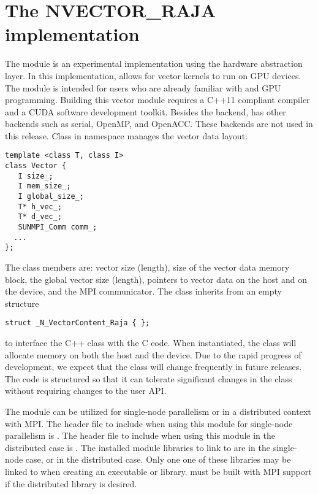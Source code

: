 %
\section{The NVECTOR\_RAJA implementation}\label{ss:nvec_raja}

The {\nvecraja} module is an experimental {\nvector} implementation using the
\href{https://software.llnl.gov/RAJA/}{\raja} hardware abstraction layer.
In this implementation, {\raja}
allows for {\sundials} vector kernels to run on GPU devices. The module is intended for users
who are already familiar with {\raja} and GPU programming. Building this vector
module requires a C++11 compliant compiler and a CUDA software development toolkit.
Besides the {\cuda} backend, {\raja} has other backends such as serial, OpenMP,
and OpenACC. These backends are not used in this {\sundials} release.
Class  in namespace  manages the vector data layout:
\begin{verbatim}
template <class T, class I>
class Vector {
   I size_;
   I mem_size_;
   I global_size_;
   T* h_vec_;
   T* d_vec_;
   SUNMPI_Comm comm_;
  ...
};
\end{verbatim}
The class members are: vector size (length), size of the vector data
memory block, the global vector size (length), pointers to vector data
on the host and on the device, and the MPI communicator. The class
 inherits from an empty structure
\begin{verbatim}
struct _N_VectorContent_Raja { };
\end{verbatim}
to interface the C++ class with the {\nvector} C code. When instantiated, the class
 will allocate memory on both the host and the device. Due to the rapid
progress of {\raja} development, we expect that the 
class will change frequently in future {\sundials} releases. The code is
structured so that it can tolerate significant changes in the
 class without requiring changes to the user API.


The {\nvecraja} module can be utilized for single-node parallelism or in a distributed context with MPI.
The header file to include when using this module for single-node parallelism is .
The header file to include when using this module in the distributed case is .
The installed module libraries to link to are  in the single-node case, or  in the distributed case. Only one one of these libraries may be linked to when creating an executable or library. {\sundials} must be built with
MPI support if the distributed library is desired.


